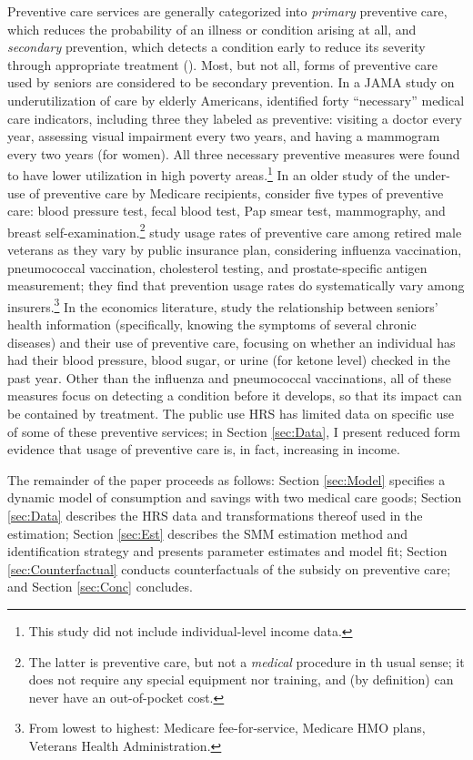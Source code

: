 \documentclass[12pt,pdftex,letterpaper]{article}
\begin{document}
Preventive care services are generally categorized into \textit{primary} preventive care, which reduces the probability of an illness or condition arising at all, and \textit{secondary} prevention, which detects a condition early to reduce its severity through appropriate treatment (\cite{russell86}).  Most, but not all, forms of preventive care used by seniors are considered to be secondary prevention.  In a JAMA study on underutilization of care by elderly Americans, \cite{asch00} identified forty ``necessary'' medical care indicators, including three they labeled as preventive: visiting a doctor every year, assessing visual impairment every two years, and having a mammogram every two years (for women).  All three necessary preventive measures were found to have lower utilization in high poverty areas.\footnote{This study did not include individual-level income data.}  In an older study of the under-use of preventive care by Medicare recipients, \cite{chao87} consider five types of preventive care: blood pressure test, fecal blood test, Pap smear test, mammography, and breast self-examination.\footnote{The latter is preventive care, but not a \textit{medical} procedure in th usual sense; it does not require any special equipment nor training, and (by definition) can never have an out-of-pocket cost.}  \cite{keyhani07} study usage rates of preventive care among retired male veterans as they vary by public insurance plan, considering influenza vaccination, pneumococcal vaccination, cholesterol testing, and prostate-specific antigen measurement; they find that prevention usage rates do systematically vary among insurers.\footnote{From lowest to highest: Medicare fee-for-service, Medicare HMO plans, Veterans Health Administration.}  In the economics literature, \cite{hsieh97} study the relationship between seniors' health information (specifically, knowing the symptoms of several chronic diseases) and their use of preventive care, focusing on whether an individual has had their blood pressure, blood sugar, or urine (for ketone level) checked in the past year.  Other than the influenza and pneumococcal vaccinations, all of these measures focus on detecting a condition before it develops, so that its impact can be contained by treatment.  The public use HRS has limited data on specific use of some of these preventive services; in Section \ref{sec:Data}, I present reduced form evidence that usage of preventive care is, in fact, increasing in income.

The remainder of the paper proceeds as follows: Section \ref{sec:Model} specifies a dynamic model of consumption and savings with two medical care goods; Section \ref{sec:Data} describes the HRS data and transformations thereof used in the estimation; Section \ref{sec:Est} describes the SMM estimation method and identification strategy and presents parameter estimates and model fit; Section \ref{sec:Counterfactual} conducts counterfactuals of the subsidy on preventive care; and Section \ref{sec:Conc} concludes.
\end{document}
